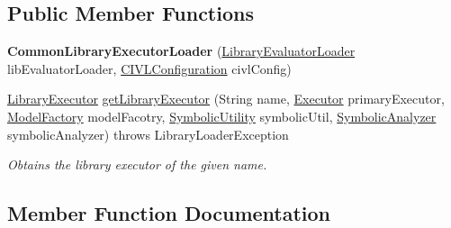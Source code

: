 \subsection*{Public Member Functions}
\begin{DoxyCompactItemize}
\item 
\hypertarget{classedu_1_1udel_1_1cis_1_1vsl_1_1civl_1_1semantics_1_1common_1_1CommonLibraryExecutorLoader_a11a16572194870eb2d72bc10c3eb01f6}{}{\bfseries Common\+Library\+Executor\+Loader} (\hyperlink{interfaceedu_1_1udel_1_1cis_1_1vsl_1_1civl_1_1semantics_1_1IF_1_1LibraryEvaluatorLoader}{Library\+Evaluator\+Loader} lib\+Evaluator\+Loader, \hyperlink{classedu_1_1udel_1_1cis_1_1vsl_1_1civl_1_1config_1_1IF_1_1CIVLConfiguration}{C\+I\+V\+L\+Configuration} civl\+Config)\label{classedu_1_1udel_1_1cis_1_1vsl_1_1civl_1_1semantics_1_1common_1_1CommonLibraryExecutorLoader_a11a16572194870eb2d72bc10c3eb01f6}

\item 
\hyperlink{interfaceedu_1_1udel_1_1cis_1_1vsl_1_1civl_1_1semantics_1_1IF_1_1LibraryExecutor}{Library\+Executor} \hyperlink{classedu_1_1udel_1_1cis_1_1vsl_1_1civl_1_1semantics_1_1common_1_1CommonLibraryExecutorLoader_a83312b42bd8bced4590447bb1c9741bf}{get\+Library\+Executor} (String name, \hyperlink{interfaceedu_1_1udel_1_1cis_1_1vsl_1_1civl_1_1semantics_1_1IF_1_1Executor}{Executor} primary\+Executor, \hyperlink{interfaceedu_1_1udel_1_1cis_1_1vsl_1_1civl_1_1model_1_1IF_1_1ModelFactory}{Model\+Factory} model\+Facotry, \hyperlink{interfaceedu_1_1udel_1_1cis_1_1vsl_1_1civl_1_1dynamic_1_1IF_1_1SymbolicUtility}{Symbolic\+Utility} symbolic\+Util, \hyperlink{interfaceedu_1_1udel_1_1cis_1_1vsl_1_1civl_1_1semantics_1_1IF_1_1SymbolicAnalyzer}{Symbolic\+Analyzer} symbolic\+Analyzer)  throws Library\+Loader\+Exception 
\begin{DoxyCompactList}\small\item\em Obtains the library executor of the given name. \end{DoxyCompactList}\end{DoxyCompactItemize}


\subsection{Member Function Documentation}
\hypertarget{classedu_1_1udel_1_1cis_1_1vsl_1_1civl_1_1semantics_1_1common_1_1CommonLibraryExecutorLoader_a83312b42bd8bced4590447bb1c9741bf}{}

